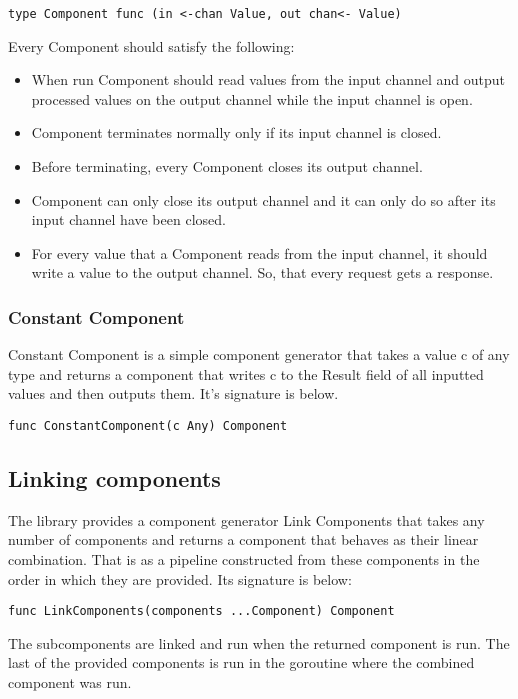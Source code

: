 \documentclass[12pt,a4paper]{article}
\begin{document}
\begin{lstlisting}
type Component func (in <-chan Value, out chan<- Value)
\end{lstlisting}

Every Component should satisfy the following:
\begin{itemize}
  \item When run Component should read values from the input channel
				and output processed values on the output channel while the input 
				channel is open.
	\item Component terminates normally only if its input channel is closed.
	\item Before terminating, every Component closes its output channel.
	\item Component can only close its output channel and it can only do so
				after its input channel have been closed.
	\item For every value that a Component reads from the input channel, 
				it should write a value to the output channel. So, that every request 
				gets a response.
  
\end{itemize}

\subsubsection{Constant Component}
Constant Component is a simple component generator that takes a value c
of any type and returns a component that writes c to the Result field of all inputted values and then outputs them. It's signature is below.
\begin{lstlisting}
func ConstantComponent(c Any) Component
\end{lstlisting}

\subsection{Linking components}
The library provides a component generator Link Components that takes 
any number of components and returns a component that behaves as their 
linear combination. That is as a pipeline constructed from these components 
in the order in which they are provided. Its signature is below:
\begin{lstlisting}
func LinkComponents(components ...Component) Component
\end{lstlisting}
The subcomponents are linked and run when the returned component is run. 
The last of the provided components is run in the goroutine where
the combined component was run.
\end{document}
